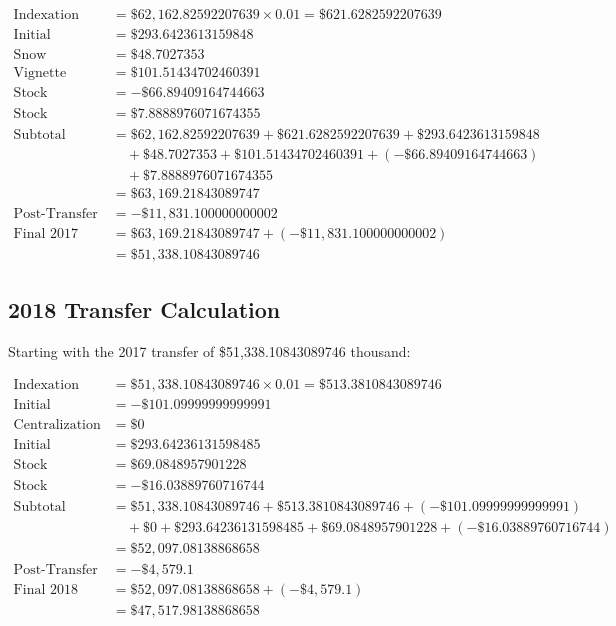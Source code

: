 \documentclass{article}
\begin{document}
\begin{align}
\text{Indexation} &= \$62,162.82592207639 \times 0.01 = \$621.6282592207639\\
\text{Initial Adjustment} &= \$293.6423613159848\\
\text{Snow Removal} &= \$48.7027353\\
\text{Vignette Compensation} &= \$101.51434702460391\\
\text{Stock Increase (Local)} &= -\$66.89409164744663\\
\text{Stock Increase (Delegated)} &= \$7.8888976071674355\\
\text{Subtotal} &= \$62,162.82592207639 + \$621.6282592207639 + \$293.6423613159848\\
&\quad + \$48.7027353 + \$101.51434702460391 + (-\$66.89409164744663)\\
&\quad + \$7.8888976071674355\\
&= \$63,169.21843089747\\
\text{Post-Transfer Adjustment} &= -\$11,831.100000000002\\
\text{Final 2017 Transfer} &= \$63,169.21843089747 + (-\$11,831.100000000002)\\
&= \$51,338.10843089746
\end{align}

\subsection{2018 Transfer Calculation}

Starting with the 2017 transfer of \$51,338.10843089746 thousand:

\begin{align}
\text{Indexation} &= \$51,338.10843089746 \times 0.01 = \$513.3810843089746\\
\text{Initial Adjustment} &= -\$101.09999999999991\\
\text{Centralization Impact} &= \$0\\
\text{Initial Adjustment 2} &= \$293.64236131598485\\
\text{Stock Increase (Local)} &= \$69.0848957901228\\
\text{Stock Increase (Delegated)} &= -\$16.03889760716744\\
\text{Subtotal} &= \$51,338.10843089746 + \$513.3810843089746 + (-\$101.09999999999991)\\
&\quad + \$0 + \$293.64236131598485 + \$69.0848957901228 + (-\$16.03889760716744)\\
&= \$52,097.08138868658\\
\text{Post-Transfer Adjustment} &= -\$4,579.1\\
\text{Final 2018 Transfer} &= \$52,097.08138868658 + (-\$4,579.1)\\
&= \$47,517.98138868658
\end{align}
\end{document}
